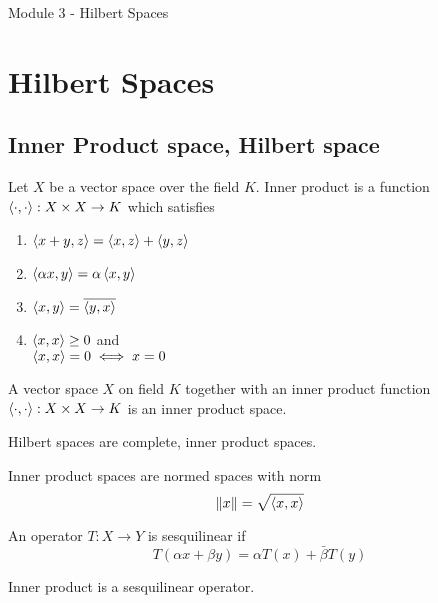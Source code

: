 \pagebreak
{\Large Module 3 - Hilbert Spaces}
\section{Hilbert Spaces}
\subsection{Inner Product space, Hilbert space}
\begin{definition}
	Let $X$ be a vector space over the field $K$.
	Inner product is a function $\left\langle \cdot,\cdot \right\rangle : X \times X \to K$ which satisfies
	\begin{enumerate}
		\item $\left\langle x+y,z \right\rangle = \left\langle x,z \right\rangle + \left\langle y,z \right\rangle$
		\item $\left\langle \alpha x,y \right\rangle = \alpha \left\langle x,y \right\rangle$
		\item $\left\langle x,y \right\rangle = \overline{\left\langle y,x \right\rangle}$
		\item $\left\langle x,x \right\rangle \ge 0$ and \\
			$\left\langle x,x \right\rangle = 0 \iff x = 0$
	\end{enumerate}
\end{definition}
\begin{definition}
	A vector space $X$ on field $K$ together with an inner product function $\left\langle \cdot,\cdot \right\rangle : X \times X \to K$ is an inner product space.
\end{definition}
\begin{definition}[Hilbert]
	Hilbert spaces are complete, inner product spaces.
\end{definition}

\begin{remark}
	Inner product spaces are normed spaces with norm 
	\[ \|x\| = \sqrt{\left\langle x,x \right\rangle} \]
\end{remark}

\begin{definition}[sesquilinear]
	An operator $T : X \to Y$ is sesquilinear if 
	\[ T(\alpha x + \beta y) = \alpha T(x) + \bar{\beta}T(y) \]
\end{definition}

\begin{important}
Inner product is a sesquilinear operator.
\end{important}

